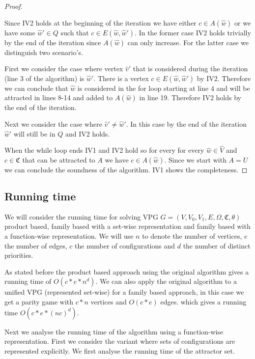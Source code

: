 \begin{theorem}
\begin{proof}
\begin{itemize}
			Since IV2 holds at the beginning of the iteration we have either $c \in A(\hat{w})$ or we have some $\hat{w}' \in Q$ such that $c \in E(\hat{w},\hat{w}')$. In the former case IV2 holds trivially by the end of the iteration since $A(\hat{w})$ can only increase. For the latter case we distinguish two scenario's. 
			
			First we consider the case where vertex $\hat{v}'$ that is considered during the iteration (line 3 of the algorithm) is $\hat{w}'$. There is a vertex $c \in E(\hat{w},\hat{w}')$ by IV2. Therefore we can conclude that $\hat{w}$ is considered in the for loop starting at line $4$ and will be attracted in lines 8-14 and added to $A(\hat{w})$ in line 19. Therefore IV2 holds by the end of the iteration.
			
			Next we consider the case where $\hat{v}' \neq \hat{w}'$. In this case by the end of the iteration $\hat{w}'$ will still be in $Q$ and IV2 holds.
		\end{itemize}
	
		When the while loop ends IV1 and IV2 hold so for every for every $\hat{w} \in \hat{V}$ and $c \in \mathfrak{C}$ that can be attracted to $A$ we have $c \in A(\hat{w})$. Since we start with $A = U$ we can conclude the soundness of the algorithm. IV1 shows the completeness.
	\end{proof}
\end{theorem}


\subsection{Running time}
We will consider the running time for solving VPG $G = (V,V_0,V_1,E,\Omega,\mathfrak{C},\theta)$ product based, family based with a set-wise representation and family based with a function-wise representation. We will use $n$ to denote the number of vertices, $e$ the number of edges, $c$ the number of configurations and $d$ the number of distinct priorities.

As stated before the product based approach using the original algorithm gives a running time of $O(c * e * n^d)$. We can also apply the original algorithm to a unified VPG (represented set-wise) for a family based approach, in this case we get a parity game with $c*n$ vertices and $O(c*e)$ edges. which gives a running time $O(c*e*(nc)^d)$.

Next we analyse the running time of the algorithm using a function-wise representation. First we consider the variant where sets of configurations are represented explicitly. We first analyse the running time of the attractor set. 

